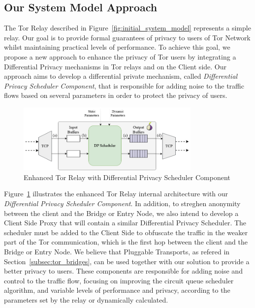 \subsection{Our System Model Approach}\label{subsec:our_system_model_approach}

The Tor Relay described in Figure~\ref{fig:initial_system_model} represents a simple relay. Our goal is to provide formal guarantees of privacy to users of Tor Network whilst maintaining practical levels of performance. To achieve this goal, we propose a new approach to enhance the privacy of Tor users by integrating a Differential Privacy mechanisms in Tor relays and on the Client side. 
Our approach aims to develop a differential private mechanism, called \textit{Differential Privacy Scheduler Component}, that is responsible for adding noise to the traffic flows based on several parameters in order to protect the privacy of users.  
\begin{figure}[!h]
    \centering
    \includegraphics[width=0.8\textwidth]{Chapters/Figures/Fig2_dp.png}
    \caption{Enhanced Tor Relay with Differential Privacy Scheduler Component}\label{fig:our_system_model}
\end{figure}
Figure~\ref{fig:our_system_model} illustrates the enhanced Tor Relay internal architecture with our \textit{Differential Privacy Scheduler Component}. 
In addition, to streghen anonymity between the client and the Bridge or Entry Node, we also intend to develop a Client Side Proxy that will contain a similar Differential Privacy Scheduler. The scheduler must be added to the Client Side to obfuscate the traffic in the weaker part of the Tor communication, which is the first hop between the client and the Bridge or Entry Node. We believe that Pluggable Transports, as refered in Section~\ref{subsec:tor_bridges}, can be used together with our solution to provide a better privacy to users.
These components are responsible for adding noise and control to the traffic flow, focusing on improving the circuit queue scheduler algorithm, and variable levels of performance and privacy, according to the parameters set by the relay or dynamically calculated.   

